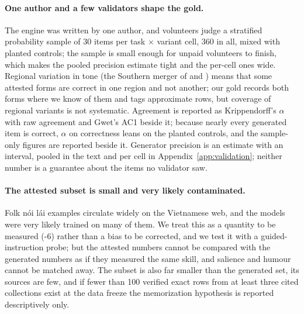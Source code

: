 \paragraph{One author and a few validators shape the gold.}
The engine was written by one author, and  volunteers judge a stratified probability sample of 30 items per task $\times$ variant cell, 360 in all, mixed with planted controls; the sample is small enough for unpaid volunteers to finish, which makes the pooled precision estimate tight and the per-cell ones wide. Regional variation in tone (the Southern merger of  and ) means that some attested forms are correct in one region and not another; our gold records both forms where we know of them and tags approximate rows, but coverage of regional variants is not systematic. Agreement is reported as Krippendorff's $\alpha$ with raw agreement and Gwet's AC1 beside it; because nearly every generated item is correct, $\alpha$ on correctness leans on the planted controls, and the sample-only figures are reported beside it. Generator precision is an estimate with an interval, pooled in the text and per cell in Appendix~\ref{app:validation}; neither number is a guarantee about the items no validator saw.

\paragraph{The attested subset is small and very likely contaminated.}
Folk nói lái examples circulate widely on the Vietnamese web, and the models were very likely trained on many of them. We treat this as a quantity to be measured (\hyp{6}) rather than a bias to be corrected, and we test it with a guided-instruction probe; but the attested numbers cannot be compared with the generated numbers as if they measured the same skill, and salience and humour cannot be matched away. The subset is also far smaller than the generated set, its sources are few, and if fewer than 100 verified exact rows from at least three cited collections exist at the data freeze the memorization hypothesis is reported descriptively only.

